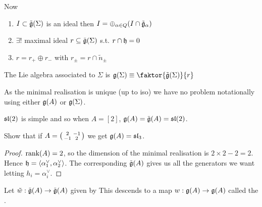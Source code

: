 \documentclass{article}
\begin{document}
Now 
\begin{lemma}
\begin{enumerate}
    \item $I \subset \tilde{\mathfrak{g}}(\Sigma)$ is an ideal then $I = \oplus_{\alpha \in Q} (I \cap \tilde{\mathfrak{g}}_\alpha)$
    \item $\exists! $ maximal ideal $r \subseteq \tilde{\mathfrak{g}}(\Sigma)$ s.t. $r \cap \mathfrak{h}=0$ 
    \item $r = r_+ \oplus r_-$ with $r_\pm = r \cap \tilde{n}_\pm$
\end{enumerate}
\end{lemma}

\begin{definition}
The  Lie algebra associated to $\Sigma$ is $\mf{g}(\Sigma)\equiv \faktor{\tilde{\mf{g}}(\Sigma)}{r}$
\end{definition}

\begin{remark}
	As the minimal realisation is unique (up to iso) we have no problem notationally using either $\mathfrak{g}(A)$ or $\mathfrak{g}(\Sigma)$.
\end{remark}

\begin{example}
	$\mathfrak{sl}(2)$ is simple and so when $A=[2]$, $\mathfrak{g}(A) = \tilde{\mathfrak{g}}(A) = \mathfrak{sl}(2)$.
\end{example}

\begin{ex}
	Show that if $A = \begin{psmallmatrix} 2 & -1 \\ -1 & 2 \end{psmallmatrix} $ we get $\mathfrak{g}(A) = \mathfrak{sl}_3$. 
\end{ex}
\begin{proof}
	$\operatorname{rank}(A) = 2$, so the dimension of the minimal realisation is $2\times 2 - 2 = 2$. Hence $\mathfrak{h} = \left\langle \alpha_1^\vee,\alpha_2^\vee \right\rangle$. The corresponding $\tilde{\mathfrak{g}}(A)$ gives us all the generators we want letting $h_i = \alpha_i^\vee$.
\end{proof}

\begin{definition}
Let $\tilde{w}:\tilde{\mathfrak{g}}(A) \to \tilde{\mathfrak{g}}(A)$ given by 
This descends to a map $w:\mathfrak{g}(A) \to \mathfrak{g}(A)$ called the .
\end{definition}
\end{document}
